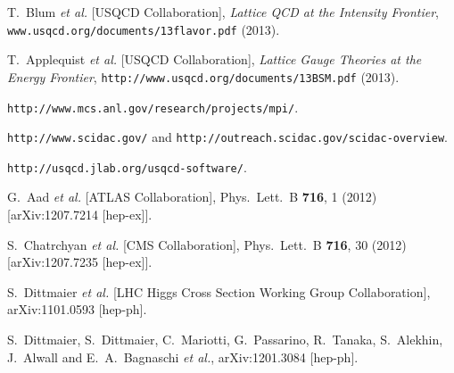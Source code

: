 
\begin{thebibliography}{99}

  
T.~Blum {\em et al.} [USQCD Collaboration],
{\em Lattice QCD at the Intensity Frontier},
{\tt www.usqcd.org/documents/13flavor.pdf} (2013).

T.~Applequist {\em et al.} [USQCD Collaboration],
{\em Lattice Gauge Theories at the Energy Frontier},
{\tt http://www.usqcd.org/documents/13BSM.pdf} (2013).

{\tt http://www.mcs.anl.gov/research/projects/mpi/}.

{\tt http://www.scidac.gov/} and {\tt http://outreach.scidac.gov/scidac-overview}.
  
{\tt http://usqcd.jlab.org/usqcd-software/}.


  G.~Aad {\it et al.}  [ATLAS Collaboration],
  Phys.\ Lett.\ B {\bf 716}, 1 (2012)
  [arXiv:1207.7214 [hep-ex]].

  S.~Chatrchyan {\it et al.}  [CMS Collaboration],
  Phys.\ Lett.\ B {\bf 716}, 30 (2012)
  [arXiv:1207.7235 [hep-ex]].

  S.~Dittmaier {\it et al.}  [LHC Higgs Cross Section Working Group Collaboration],
  arXiv:1101.0593 [hep-ph].

  S.~Dittmaier, S.~Dittmaier, C.~Mariotti, G.~Passarino, R.~Tanaka, S.~Alekhin, J.~Alwall and E.~A.~Bagnaschi {\it et al.},
  arXiv:1201.3084 [hep-ph].


\end{thebibliography}
